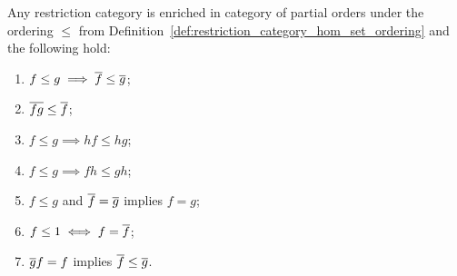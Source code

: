 \begin{lemma}\label{lem:restriction_cats_are_partial_order_enriched}
  Any restriction category \X is enriched in category of partial orders under the ordering $\le$ from
  Definition~\ref{def:restriction_category_hom_set_ordering} and the following hold:
  \begin{multicols}{2}
    \begin{enumerate}[{(}i{)}]
      \item $f \le g \implies \overline{f} \le \overline{g}$;\label{lemitem:rst_ordering_2}
      \item $\overline{f g} \le \overline{f}$; \label{lemitem:rst_ordering_3}
      \item $f \le g \implies h f \le h g$;
      \item $f \le g \implies f h \le g h$;
      \item $f \le g$ and $\overline{f} = \overline{g}$ implies $f = g$;
      \item $f \le 1 \iff f = \overline{f}$;
      \item $\overline{g}f = f$ implies $\overline{f} \le \overline{g}$.
    \end{enumerate}
  \end{multicols}
\end{lemma}
